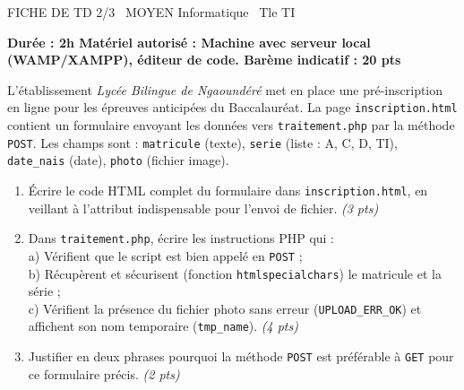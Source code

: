 \documentclass[11pt]{article}
\begin{document}
\begin{tcolorbox}[enhanced,colback=popink,colframe=popink,arc=10pt,boxrule=0pt,left=12pt,right=12pt,top=9pt,bottom=9pt]
{\color{white}\popxbold\small FICHE DE TD 2/3 \textbullet\ MOYEN \hfill Informatique \textbullet\ Tle TI\par}
\end{tcolorbox}
\vspace{4pt}
\textbf{Durée : 2h \quad Matériel autorisé : Machine avec serveur local (WAMP/XAMPP), éditeur de code. \quad Barème indicatif : 20 pts}

\begin{exercice}
L'établissement \textit{Lycée Bilingue de Ngaoundéré} met en place une pré-inscription en ligne pour les épreuves anticipées du Baccalauréat. La page \texttt{inscription.html} contient un formulaire envoyant les données vers \texttt{traitement.php} par la méthode \texttt{POST}. Les champs sont : \texttt{matricule} (texte), \texttt{serie} (liste : A, C, D, TI), \texttt{date\_nais} (date), \texttt{photo} (fichier image).
\begin{enumerate}
    \item Écrire le code HTML complet du formulaire dans \texttt{inscription.html}, en veillant à l'attribut indispensable pour l'envoi de fichier. \textit{(3 pts)}
    \item Dans \texttt{traitement.php}, écrire les instructions PHP qui :\\
    a) Vérifient que le script est bien appelé en \texttt{POST} ;\\
    b) Récupèrent et sécurisent (fonction \texttt{htmlspecialchars}) le matricule et la série ;\\
    c) Vérifient la présence du fichier photo sans erreur (\texttt{UPLOAD\_ERR\_OK}) et affichent son nom temporaire (\texttt{tmp\_name}). \textit{(4 pts)}
    \item Justifier en deux phrases pourquoi la méthode \texttt{POST} est préférable à \texttt{GET} pour ce formulaire précis. \textit{(2 pts)}
\end{enumerate}
\end{exercice}
\end{document}
